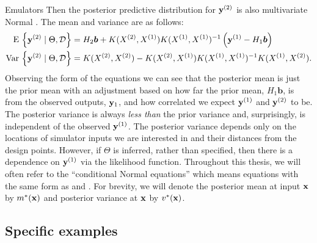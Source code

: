 \begin{chapter}{Emulators \label{Ch:Emulators}}
Then the posterior predictive distribution for $\mathbf{y}^{(2)}$ is also multivariate Normal \citep{Rasmussen2006Gpfm}. The mean and variance are as follows:
\begin{align}
  \textrm{E}\, \left\{ \mathbf{y}^{(2)} \mid \Theta, \mathcal{D} \right\} &= H_2 \bm{b} + K(X^{(2)}, X^{(1)})K(X^{(1)}, X^{(1)})^{-1} \left( \mathbf{y}^{(1)} - H_1 \bm{b} \right) \label{Eq:MV1}\\
  \mathrm{Var}\, \left\{\mathbf{y}^{(2)} \mid \Theta, \mathcal{D} \right\} &= K(X^{(2)}, X^{(2)})- K(X^{(2)}, X^{(1)})K(X^{(1)}, X^{(1)})^{-1}K(X^{(1)}, X^{(2)}).\label{Eq:MV2}
\end{align}
Observing the form of the equations we can see that the posterior mean is just the prior mean with an adjustment based on how far the prior mean, $H_1 \bm{b}$, is from the observed outputs, $\mathbf{y}_1$, and how correlated we expect $\mathbf{y}^{(1)}$ and $\mathbf{y}^{(2)}$ to be. The posterior variance is always \textit{less than} the prior variance and, surprisingly, is independent of the observed $\mathbf{y}^{(1)}$. The posterior variance depends only on the locations of simulator inputs we are interested in and their distances from the design points. However, if $\Theta$ is inferred, rather than specified, then there is a dependence on $\mathbf{y}^{(1)}$ via the likelihood function. Throughout this thesis, we will often refer to the ``conditional Normal equations'' which means equations with the same form as  and . For brevity, we will denote the posterior mean at input $\mathbf{x}$ by $m^{*}(\mathbf{x})$ and posterior variance at $\mathbf{x}$ by $v^{*}(\mathbf{x})$.

\subsection{Specific examples}


\end{chapter}
